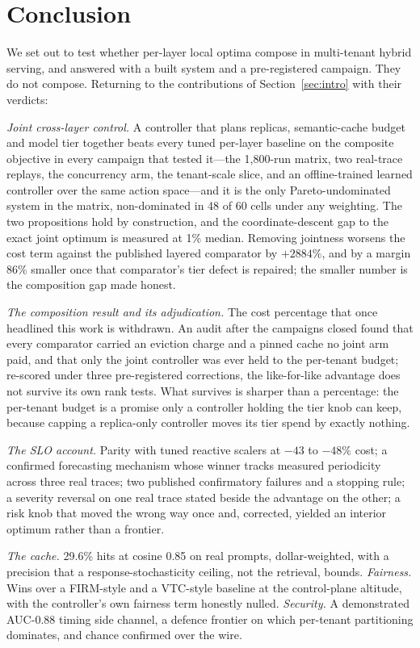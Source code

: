 \section{Conclusion}
\label{sec:conclusion}

We set out to test whether per-layer local optima compose in multi-tenant
hybrid serving, and answered with a built system and a pre-registered
campaign. They do not compose. Returning to the contributions of
Section~\ref{sec:intro} with their verdicts:

\emph{Joint cross-layer control.} A controller that plans replicas,
semantic-cache budget and model tier together beats every tuned per-layer
baseline on the composite objective in every campaign that tested it---the
1,800-run matrix, two real-trace replays, the concurrency arm, the
tenant-scale slice, and an offline-trained learned controller over the
same action space---and it is the only Pareto-undominated system in the
matrix, non-dominated in 48 of 60 cells under any weighting. The two
propositions hold by construction, and the coordinate-descent gap to the
exact joint optimum is measured at 1\% median. Removing jointness worsens
the cost term against the published layered comparator by $+2884\%$, and by
a margin 86\% smaller once that comparator's tier defect is repaired; the
smaller number is the composition gap made honest.

\emph{The composition result and its adjudication.} The cost percentage
that once headlined this work is withdrawn. An audit after the campaigns
closed found that every comparator carried an eviction charge and a pinned
cache no joint arm paid, and that only the joint controller was ever held to
the per-tenant budget; re-scored under three pre-registered corrections,
the like-for-like advantage does not survive its own rank tests. What
survives is sharper than a percentage: the per-tenant budget is a promise
only a controller holding the tier knob can keep, because capping a
replica-only controller moves its tier spend by exactly nothing.

\emph{The SLO account.} Parity with tuned reactive scalers at $-43$ to
$-48\%$ cost; a confirmed forecasting mechanism whose winner tracks
measured periodicity across three real traces; two published confirmatory
failures and a stopping rule; a severity reversal on one real trace stated
beside the advantage on the other; a risk knob that moved the wrong way
once and, corrected, yielded an interior optimum rather than a frontier.

\emph{The cache.} 29.6\% hits at cosine 0.85 on real prompts,
dollar-weighted, with a precision that a response-stochasticity ceiling,
not the retrieval, bounds. \emph{Fairness.} Wins over a FIRM-style and a
VTC-style baseline at the control-plane altitude, with the controller's own
fairness term honestly nulled. \emph{Security.} A demonstrated AUC-0.88
timing side channel, a defence frontier on which per-tenant partitioning
dominates, and chance confirmed over the wire.

